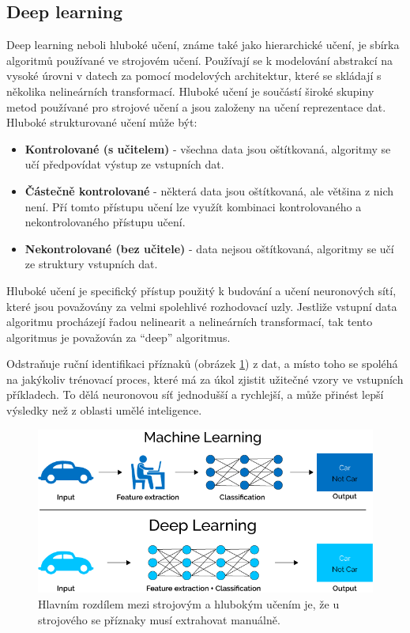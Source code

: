 \subsection{Deep learning}
Deep learning neboli hluboké učení, známe také jako hierarchické učení, je sbírka algoritmů používané ve strojovém učení. Používají se k modelování abstrakcí na vysoké úrovni v datech za pomocí modelových architektur, které se skládají s několika nelineárních transformací. Hluboké učení je součástí široké skupiny metod používané pro strojové učení a jsou založeny na učení reprezentace dat. Hluboké strukturované učení může být:
\begin{itemize}
  \item{\textbf{Kontrolované (s učitelem)} - všechna data jsou oštítkovaná, algoritmy se učí předpovídat výstup ze vstupních dat.}
  \item{\textbf{Částečně kontrolované} - některá data jsou oštítkovaná, ale většina z nich není. Pří tomto přístupu učení lze využít kombinaci kontrolovaného a nekontrolovaného přístupu učení.}
  \item{\textbf{Nekontrolované (bez učitele)} - data nejsou oštítkovaná, algoritmy se učí ze struktury vstupních dat.}
\end{itemize}
Hluboké učení je specifický přístup použitý k budování a učení neuronových sítí, které jsou považovány za velmi spolehlivé rozhodovací uzly. Jestliže vstupní data algoritmu procházejí řadou nelinearit a nelineárních transformací, tak tento algoritmus je považován za ``deep'' algoritmus. 

Odstraňuje ruční identifikaci příznaků (obrázek \ref{fig:ml_vs_ann}) z dat, a místo toho se spoléhá na jakýkoliv trénovací proces, které má za úkol zjistit užitečné vzory ve vstupních příkladech. To dělá neuronovou síť jednodušší a rychlejší, a může přinést lepší výsledky než z oblasti umělé inteligence.

\begin{figure}[H]
\centering
\includegraphics[width=.7\linewidth]{figures/ml_vs_ann}
\caption{Hlavním rozdílem mezi strojovým a hlubokým učením je, že u strojového se příznaky musí extrahovat manuálně. \cite{fig:mlvsann}}
\label{fig:ml_vs_ann}
\end{figure}

